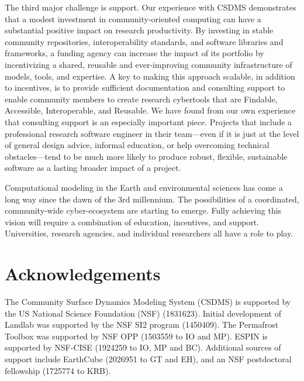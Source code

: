 \documentclass{article} %
\begin{document}
The third major challenge is support. Our experience with CSDMS demonstrates that a modest investment in community-oriented computing can have a substantial positive impact on research productivity. By investing in stable community repositories, interoperability standards, and software libraries and frameworks, a funding agency can increase the impact of its portfolio by incentivizing a shared, reusable and ever-improving community infrastructure of models, tools, and expertise. A key to making this approach scalable, in addition to incentives, is to provide sufficient documentation and consulting support to enable community members to create research cybertools that are Findable, Accessible, Interoperable, and Reusable. We have found from our own experience that consulting support is an especially important piece. Projects that include a professional research software engineer in their team---even if it is just at the level of general design advice, informal education, or help overcoming technical obstacles---tend to be much more likely to produce robust, flexible, sustainable software as a lasting broader impact of a project.

Computational modeling in the Earth and environmental sciences has come a long way since the dawn of the 3rd millennium. The possibilities of a coordinated, community-wide cyber-ecosystem are starting to emerge. Fully achieving this vision will require a combination of education, incentives, and support. Universities, research agencies, and individual researchers all have a role to play.


\section{Acknowledgements}

The Community Surface Dynamics Modeling System (CSDMS) is supported by the US National Science Foundation (NSF) (1831623). Initial development of Landlab was supported by the NSF SI2 program (1450409). The Permafrost Toolbox was supported by NSF OPP (1503559 to IO and MP). ESPIN is supported by NSF-CISE (1924259 to IO, MP and BC). Additional sources of support include EarthCube (2026951 to GT and EH), and an NSF postdoctoral fellowship (1725774 to KRB). %




\end{document}
